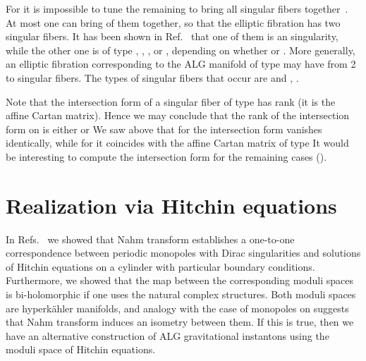 \documentclass[a4paper,12pt, amsfonts, amssymb]{article}
\providecommand{\RR}{{\mathbb R}}
\begin{document}
For \coordHE{} it is impossible to tune the remaining \coordHE{} to bring all \coordHE{}
singular fibers together~\cite{APSW}. At most one can bring \coordHE{} of them together, so that the elliptic fibration has two singular fibers.
It has been shown in Ref.~\cite{APSW} that one of them is an
\coordHE{} singularity, while the other one is of type \coordHE{}, \coordHE{},
\coordHE{}, or \coordHE{},
depending on whether \coordHE{} or \coordHE{}. More generally, an elliptic
fibration corresponding to the ALG manifold of type \coordHE{} may have from
2 to \coordHE{} singular fibers. The types of singular fibers that occur are
\coordHE{} and \coordHE{}, \coordHE{}.

Note that the intersection form of a singular fiber of type \coordHE{}
has rank \coordHE{} (it is the affine \coordHE{} Cartan matrix). Hence
we may conclude that the rank of the intersection form on \coordHE{}
is either \coordHE{} or \coordHE{} We saw above that for \coordHE{} the intersection form
vanishes identically, while for \coordHE{} it coincides with the affine Cartan
matrix of type \coordHE{} It would be interesting to compute the
intersection form for the remaining cases (\coordHE{}).

\section{Realization via Hitchin equations}

In Refs.~\cite{usone,ustwo} we showed that Nahm transform establishes a one-to-one
correspondence between periodic monopoles with Dirac singularities and
solutions of Hitchin equations on a cylinder with particular boundary
conditions. Furthermore, we showed that the map between the corresponding
moduli spaces is bi-holomorphic if one uses the natural complex structures.
Both moduli spaces are hyperk\"ahler manifolds, and analogy with the case
of monopoles on \myHighlight{$\RR^3$}\coordHE{} suggests that Nahm transform induces an isometry
between them. If this is true, then we have an alternative
construction of ALG gravitational instantons using the moduli space of
Hitchin equations.
\end{document}
